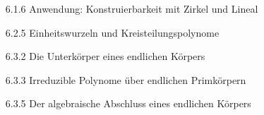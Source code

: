 \begin{itemize}
  \item
  [6.1.6]
  Anwendung: Konstruierbarkeit mit Zirkel und Lineal

  \item
  [6.2.5]
  Einheitswurzeln und Kreisteilungspolynome

  \item
  [6.3.2]
  Die Unterkörper eines endlichen Körpers

  \item
  [6.3.3]
  Irreduzible Polynome über endlichen Primkörpern

  \item
  [6.3.5]
  Der algebraische Abschluss eines endlichen Körpers

\end{itemize}
